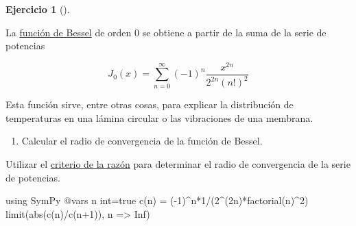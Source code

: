 \documentclass[
  a4paper,
]{scrreport}
\newenvironment{Shaded}{\begin{snugshade}}{\end{snugshade}}
\newcommand{\BuiltInTok}[1]{\textcolor[rgb]{0.00,0.23,0.31}{#1}}
\newcommand{\ConstantTok}[1]{\textcolor[rgb]{0.56,0.35,0.01}{#1}}
\newcommand{\FloatTok}[1]{\textcolor[rgb]{0.68,0.00,0.00}{#1}}
\newcommand{\FunctionTok}[1]{\textcolor[rgb]{0.28,0.35,0.67}{#1}}
\newcommand{\ImportTok}[1]{\textcolor[rgb]{0.00,0.46,0.62}{#1}}
\newcommand{\NormalTok}[1]{\textcolor[rgb]{0.00,0.23,0.31}{#1}}
\newcommand{\OperatorTok}[1]{\textcolor[rgb]{0.37,0.37,0.37}{#1}}
\newcommand{\PreprocessorTok}[1]{\textcolor[rgb]{0.68,0.00,0.00}{#1}}
\providecommand{\tightlist}{%
  \setlength{\itemsep}{0pt}\setlength{\parskip}{0pt}}\usepackage{longtable,booktabs,array}
\theoremstyle{definition}
\newtheorem{exercise}{Ejercicio}[chapter]
\theoremstyle{remark}
\begin{document}
\leavevmode{}%
\begin{exercise}[]\label{exr-serie-bessel}

La \href{https://es.wikipedia.org/wiki/Funci\%C3\%B3n_de_Bessel}{función
de Bessel} de orden 0 se obtiene a partir de la suma de la serie de
potencias

\[
J_0(x) = \sum_{n=0}^\infty (-1)^n\frac{x^{2n}}{2^{2n}(n!)^2}
\]

Esta función sirve, entre otras cosas, para explicar la distribución de
temperaturas en una lámina circular o las vibraciones de una membrana.

\begin{enumerate}
\def\labelenumi{\alph{enumi}.}
\tightlist
\item
  Calcular el radio de convergencia de la función de Bessel.
\end{enumerate}

\begin{tcolorbox}[enhanced jigsaw, colframe=quarto-callout-note-color-frame, breakable, colback=white, coltitle=black, left=2mm, toptitle=1mm, colbacktitle=quarto-callout-note-color!10!white, bottomtitle=1mm, opacityback=0, opacitybacktitle=0.6, title=\textcolor{quarto-callout-note-color}{\faInfo}\hspace{0.5em}{Ayuda}, titlerule=0mm, toprule=.15mm, arc=.35mm, leftrule=.75mm, rightrule=.15mm, bottomrule=.15mm]

Utilizar el
\href{https://aprendeconalf.es/analisis-manual/08-series.html\#thm-radio-convergencia-razon}{criterio
de la razón} para determinar el radio de convergencia de la serie de
potencias.

\end{tcolorbox}

\begin{tcolorbox}[enhanced jigsaw, colframe=quarto-callout-tip-color-frame, breakable, colback=white, coltitle=black, left=2mm, toptitle=1mm, colbacktitle=quarto-callout-tip-color!10!white, bottomtitle=1mm, opacityback=0, opacitybacktitle=0.6, title=\textcolor{quarto-callout-tip-color}{\faLightbulb}\hspace{0.5em}{Solución}, titlerule=0mm, toprule=.15mm, arc=.35mm, leftrule=.75mm, rightrule=.15mm, bottomrule=.15mm]

\begin{Shaded}
\begin{Highlighting}[]
\ImportTok{using} \BuiltInTok{SymPy}
\PreprocessorTok{@vars}\NormalTok{ n int}\OperatorTok{=}\ConstantTok{true}
\FunctionTok{c}\NormalTok{(n) }\OperatorTok{=}\NormalTok{ (}\OperatorTok{{-}}\FloatTok{1}\NormalTok{)}\OperatorTok{\^{}}\NormalTok{n}\OperatorTok{*}\FloatTok{1}\OperatorTok{/}\NormalTok{(}\FloatTok{2}\OperatorTok{\^{}}\NormalTok{(}\FloatTok{2}\NormalTok{n)}\FunctionTok{*factorial}\NormalTok{(n)}\OperatorTok{\^{}}\FloatTok{2}\NormalTok{)}
\FunctionTok{limit}\NormalTok{(}\FunctionTok{abs}\NormalTok{(}\FunctionTok{c}\NormalTok{(n)}\OperatorTok{/}\FunctionTok{c}\NormalTok{(n}\OperatorTok{+}\FloatTok{1}\NormalTok{)), n }\OperatorTok{=\textgreater{}} \ConstantTok{Inf}\NormalTok{)}
\end{Highlighting}
\end{Shaded}


\end{tcolorbox}
\end{exercise}
\end{document}

